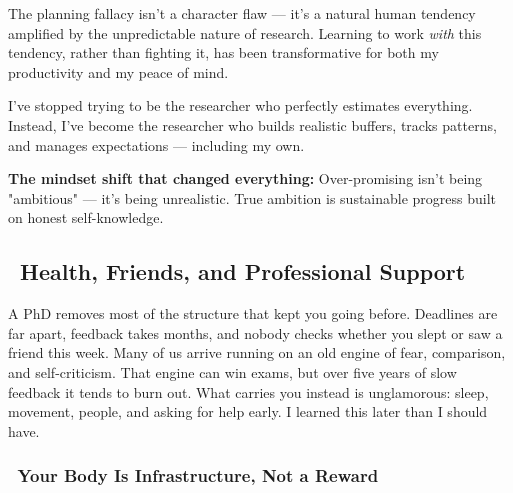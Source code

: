 \documentclass[11pt,a4paper]{article}
\begin{document}
\begin{tcolorbox}[colback=purple!5,colframe=purple!40,title={\faHeart~My Personal Realization}]
The planning fallacy isn't a character flaw — it's a natural human tendency amplified by the unpredictable nature of research. Learning to work \textit{with} this tendency, rather than fighting it, has been transformative for both my productivity and my peace of mind.

I've stopped trying to be the researcher who perfectly estimates everything. Instead, I've become the researcher who builds realistic buffers, tracks patterns, and manages expectations — including my own.

\textbf{The mindset shift that changed everything:} Over-promising isn't being "ambitious" — it's being unrealistic. True ambition is sustainable progress built on honest self-knowledge.
\end{tcolorbox}

\subsection{\faHeartbeat~Health, Friends, and Professional Support}\label{sec:health}

\begin{tcolorbox}[colback=blue!5,colframe=darkblue,title={Why This Gets Its Own Section}]
A PhD removes most of the structure that kept you going before. Deadlines are far apart, feedback takes months, and nobody checks whether you slept or saw a friend this week. Many of us arrive running on an old engine of fear, comparison, and self-criticism. That engine can win exams, but over five years of slow feedback it tends to burn out. What carries you instead is unglamorous: sleep, movement, people, and asking for help early. I learned this later than I should have.
\end{tcolorbox}

\subsubsection{\faBed~Your Body Is Infrastructure, Not a Reward}
\end{document}
